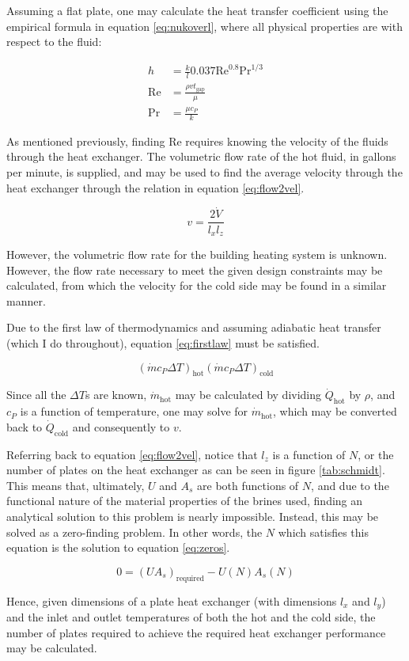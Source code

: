 \documentclass[12pt,letterpaper]{article}
\begin{document}
Assuming a flat plate, one may calculate the heat transfer coefficient using the empirical formula in equation \ref{eq:nukoverl}, where all physical properties are with respect to the fluid:

\begin{align}
\label{eq:nukoverl}
h &=\frac{k}{l} 0.037\textrm{Re}^{0.8}\textrm{Pr}^{1/3}\\
\label{eq:re}
\textrm{Re}&=\frac{\rho v t_{\textrm{gap}}}{\mu}\\
\label{eq:pr}
\textrm{Pr}&=\frac{\mu c_P}{k}
\end{align}

As mentioned previously, finding Re requires knowing the velocity of the fluids through the heat exchanger.  The volumetric flow rate of the hot fluid, in gallons per minute, is supplied, and may be used to find the average velocity through the heat exchanger through the relation in equation \ref{eq:flow2vel}.

\begin{equation}
\label{eq:flow2vel}
v = \frac{2\dot{V}}{l_x l_z}
\end{equation}

However, the volumetric flow rate for the building heating system is unknown. However, the flow rate necessary to meet the given design constraints may be calculated, from which the velocity for the cold side may be found in a similar manner. 

Due to the first law of thermodynamics and assuming adiabatic heat transfer (which I do throughout), equation \ref{eq:firstlaw} must be satisfied.

\begin{equation}
\label{eq:firstlaw}
\left(\dot{m} c_P \Delta T \right)_{\textrm{hot}} \left(\dot{m} c_P \Delta T \right)_{\textrm{cold}}
\end{equation}

Since all the \(\Delta T\)s are known, \(\dot{m}_{\textrm{hot}}\) may be calculated by dividing \(\dot{Q}_{\textrm{hot}}\) by \(\rho\), and \(c_P\) is a function of temperature, one may solve for \(\dot{m}_{\textrm{hot}}\), which may be converted back to \(\dot{Q}_{\textrm{cold}}\) and consequently to \(v\).

Referring back to equation \ref{eq:flow2vel}, notice that \(l_z\) is a function of \(N\), or the number of plates on the heat exchanger as can be seen in figure \ref{tab:schmidt}. This means that, ultimately, \(U\) and \(A_s\) are both functions of \(N\), and due to the functional nature of the material properties of the brines used, finding an analytical solution to this problem is nearly impossible.  Instead, this may be solved as a zero-finding problem. In other words, the \(N\) which satisfies this equation is the solution to equation \ref{eq:zeros}.

\begin{equation}
\label{eq:zeros}
0 = (UA_s)_{\textrm{required}} - U(N) A_s(N)
\end{equation}

Hence, given dimensions of a plate heat exchanger (with dimensions \(l_x\) and \(l_y\)) and the inlet and outlet temperatures of both the hot and the cold side, the number of plates required to achieve the required heat exchanger performance may be calculated.
\end{document}
